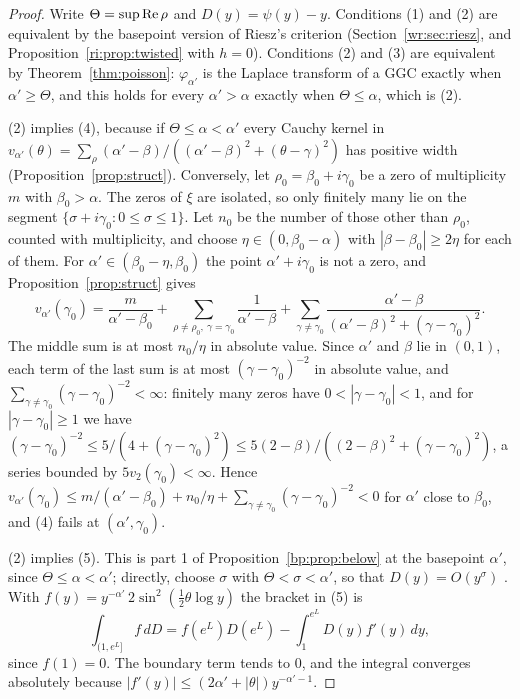 \begin{proof}
Write $\Theta=\sup\operatorname{Re}\rho$ and $D(y)=\psi(y)-y$. Conditions (1) and (2) are equivalent by the basepoint version of Riesz's criterion (Section~\ref{wr:sec:riesz}, and Proposition~\ref{ri:prop:twisted} with $h=0$). Conditions (2) and (3) are equivalent by Theorem~\ref{thm:poisson}: $\varphi_{\alpha'}$ is the Laplace transform of a GGC exactly when $\alpha'\ge\Theta$, and this holds for every $\alpha'>\alpha$ exactly when $\Theta\le\alpha$, which is (2).

(2) implies (4), because if $\Theta\le\alpha<\alpha'$ every Cauchy kernel in $v_{\alpha'}(\theta)=\sum_\rho(\alpha'-\beta)/((\alpha'-\beta)^2+(\theta-\gamma)^2)$ has positive width (Proposition~\ref{prop:struct}). Conversely, let $\rho_0=\beta_0+i\gamma_0$ be a zero of multiplicity $m$ with $\beta_0>\alpha$. The zeros of $\xi$ are isolated, so only finitely many lie on the segment $\{\sigma+i\gamma_0:0\le\sigma\le1\}$. Let $n_0$ be the number of those other than $\rho_0$, counted with multiplicity, and choose $\eta\in(0,\beta_0-\alpha)$ with $|\beta-\beta_0|\ge2\eta$ for each of them. For $\alpha'\in(\beta_0-\eta,\beta_0)$ the point $\alpha'+i\gamma_0$ is not a zero, and Proposition~\ref{prop:struct} gives
\[
v_{\alpha'}(\gamma_0)=\frac m{\alpha'-\beta_0}+\sum_{\rho\ne\rho_0,\ \gamma=\gamma_0}\frac1{\alpha'-\beta}+\sum_{\gamma\ne\gamma_0}\frac{\alpha'-\beta}{(\alpha'-\beta)^2+(\gamma-\gamma_0)^2}.
\]
The middle sum is at most $n_0/\eta$ in absolute value. Since $\alpha'$ and $\beta$ lie in $(0,1)$, each term of the last sum is at most $(\gamma-\gamma_0)^{-2}$ in absolute value, and $\sum_{\gamma\ne\gamma_0}(\gamma-\gamma_0)^{-2}<\infty$: finitely many zeros have $0<|\gamma-\gamma_0|<1$, and for $|\gamma-\gamma_0|\ge1$ we have $(\gamma-\gamma_0)^{-2}\le5/(4+(\gamma-\gamma_0)^2)\le5(2-\beta)/((2-\beta)^2+(\gamma-\gamma_0)^2)$, a series bounded by $5v_2(\gamma_0)<\infty$. Hence $v_{\alpha'}(\gamma_0)\le m/(\alpha'-\beta_0)+n_0/\eta+\sum_{\gamma\ne\gamma_0}(\gamma-\gamma_0)^{-2}<0$ for $\alpha'$ close to $\beta_0$, and (4) fails at $(\alpha',\gamma_0)$.

(2) implies (5). This is part 1 of Proposition~\ref{bp:prop:below} at the basepoint $\alpha'$, since $\Theta\le\alpha<\alpha'$; directly, choose $\sigma$ with $\Theta<\sigma<\alpha'$, so that $D(y)=O(y^\sigma)$ \cite{Titchmarsh}. With $f(y)=y^{-\alpha'}\,2\sin^2(\frac12\theta\log y)$ the bracket in (5) is
\[
\int_{(1,e^L]}f\,dD=f(e^L)D(e^L)-\int_1^{e^L}D(y)f'(y)\,dy,
\]
since $f(1)=0$. The boundary term tends to $0$, and the integral converges absolutely because $|f'(y)|\le(2\alpha'+|\theta|)y^{-\alpha'-1}$.


\end{proof}
